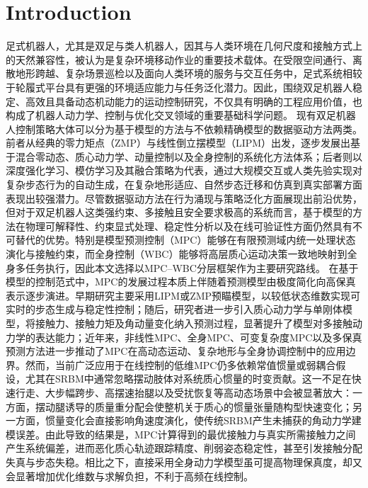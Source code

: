 ﻿\documentclass[preprint,12pt]{elsarticle}
\begin{document}
\newpage

\section{Introduction}
足式机器人，尤其是双足与类人机器人，因其与人类环境在几何尺度和接触方式上的天然兼容性，被认为是复杂环境移动作业的重要技术载体。在受限空间通行、离散地形跨越、复杂场景巡检以及面向人类环境的服务与交互任务中，足式系统相较于轮履式平台具有更强的环境适应能力与任务泛化潜力\cite{ref22,ref23,ref20,ref74,ref78}。因此，围绕双足机器人稳定、高效且具备动态机动能力的运动控制研究，不仅具有明确的工程应用价值，也构成了机器人动力学、控制与优化交叉领域的重要基础科学问题。
现有双足机器人控制策略大体可以分为基于模型的方法与不依赖精确模型的数据驱动方法两类。前者从经典的零力矩点（ZMP）与线性倒立摆模型（LIPM）出发，逐步发展出基于混合零动态、质心动力学、动量控制以及全身控制的系统化方法体系\cite{ref12,ref17,ref18,ref14,ref16,ref25,ref36,ref55,ref63}；后者则以深度强化学习、模仿学习及其融合策略为代表，通过大规模交互或人类先验实现对复杂步态行为的自动生成，在复杂地形适应、自然步态迁移和仿真到真实部署方面表现出较强潜力\cite{ref56,ref58,ref59,ref62}。尽管数据驱动方法在行为涌现与策略泛化方面展现出前沿优势，但对于双足机器人这类强约束、多接触且安全要求极高的系统而言，基于模型的方法在物理可解释性、约束显式处理、稳定性分析以及在线可验证性方面仍然具有不可替代的优势。特别是模型预测控制（MPC）能够在有限预测域内统一处理状态演化与接触约束，而全身控制（WBC）能够将高层质心运动决策一致地映射到全身多任务执行，因此本文选择以MPC--WBC分层框架作为主要研究路线。
在基于模型的控制范式中，MPC的发展过程本质上伴随着预测模型由极度简化向高保真表示逐步演进。早期研究主要采用LIPM或ZMP预瞄模型，以较低状态维数实现可实时的步态生成与稳定性控制\cite{ref17,ref18,ref19}；随后，研究者进一步引入质心动力学与单刚体模型，将接触力、接触力矩及角动量变化纳入预测过程，显著提升了模型对多接触动力学的表达能力\cite{ref25,ref44,ref49,ref50}；近年来，非线性MPC、全身MPC、可变复杂度MPC以及多保真预测方法进一步推动了MPC在高动态运动、复杂地形与全身协调控制中的应用边界\cite{ref31,ref51,ref52,ref53,ref54,ref35,ref42,ref77}。然而，当前广泛应用于在线控制的低维MPC仍多依赖常值惯量或弱耦合假设，尤其在SRBM中通常忽略摆动肢体对系统质心惯量的时变贡献\cite{ref29,ref39,ref40}。这一不足在快速行走、大步幅跨步、高摆速抬腿以及受扰恢复等高动态场景中会被显著放大：一方面，摆动腿诱导的质量重分配会使整机关于质心的惯量张量随构型快速变化；另一方面，惯量变化会直接影响角速度演化，使传统SRBM产生未捕获的角动力学建模误差。由此导致的结果是，MPC计算得到的最优接触力与真实所需接触力之间产生系统偏差，进而恶化质心轨迹跟踪精度、削弱姿态稳定性，甚至引发接触分配失真与步态失稳。相比之下，直接采用全身动力学模型虽可提高物理保真度，却又会显著增加优化维数与求解负担，不利于高频在线控制\cite{ref77}。
\end{document}

